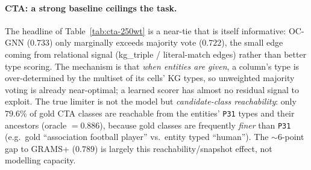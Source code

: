 
\paragraph{CTA: a strong baseline ceilings the task.}
The headline of Table~\ref{tab:cta-250wt} is a near-tie that is itself
informative: OC-GNN ($0.733$) only marginally exceeds majority vote ($0.722$),
the small edge coming from relational signal (kg\_triple / literal-match edges)
rather than better type scoring. The mechanism is that \emph{when entities are given}, a column's
type is over-determined by the multiset of its cells' KG types, so unweighted
majority voting is already near-optimal; a learned scorer has almost no residual
signal to exploit. The true limiter is not the model but \emph{candidate-class
reachability}: only $79.6\%$ of gold CTA classes are reachable from the entities'
\texttt{P31} types and their ancestors (oracle $=0.886$), because gold classes are
frequently \emph{finer} than \texttt{P31} (e.g.\ gold ``association football
player'' vs.\ entity typed ``human''). The $\sim$6-point gap to GRAMS+ ($0.789$)
is largely this reachability/snapshot effect, not modelling capacity.

